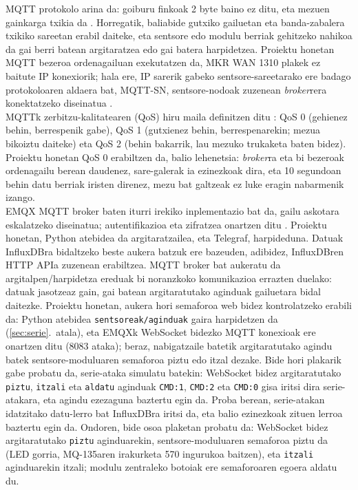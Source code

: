 \documentclass[10pt]{article}
\newcommand{\acpar}[1]{(\acs{#1})\acused{#1}}
\begin{document}
\ac{MQTT} protokolo arina da: goiburu finkoak 2 byte baino ez ditu, eta mezuen gainkarga txikia da \cite{mqtt5}. Horregatik, baliabide gutxiko gailuetan eta banda-zabalera txikiko sareetan erabil daiteke, eta sentsore edo modulu berriak gehitzeko nahikoa da gai berri batean argitaratzea edo gai batera harpidetzea. Proiektu honetan \ac{MQTT} bezeroa ordenagailuan exekutatzen da, MKR WAN 1310 plakek ez baitute \ac{IP} konexiorik; hala ere, \ac{IP} sarerik gabeko sentsore-sareetarako ere badago protokoloaren aldaera bat, MQTT-SN, sentsore-nodoak zuzenean \textit{broker}rera konektatzeko diseinatua \cite{hunkeler2008mqtt}.\\

\ac{MQTT}k zerbitzu-kalitatearen \acpar{QoS} hiru maila definitzen ditu \cite{mqtt5}: \acs{QoS} 0 (gehienez behin, berrespenik gabe), \acs{QoS} 1 (gutxienez behin, berrespenarekin; mezua bikoiztu daiteke) eta \acs{QoS} 2 (behin bakarrik, lau mezuko trukaketa baten bidez). Proiektu honetan \acs{QoS} 0 erabiltzen da, balio lehenetsia: \textit{broker}ra eta bi bezeroak ordenagailu berean daudenez, sare-galerak ia ezinezkoak dira, eta 10 segundoan behin datu berriak iristen direnez, mezu bat galtzeak ez luke eragin nabarmenik izango.\\

EMQX \ac{MQTT} broker baten iturri irekiko inplementazio bat da, gailu askotara eskalatzeko diseinatua; autentifikazioa eta zifratzea onartzen ditu \cite{bender2021open}. Proiektu honetan, Python atebidea da argitaratzailea, eta Telegraf, harpideduna. Datuak InfluxDBra bidaltzeko beste aukera batzuk ere bazeuden, adibidez, InfluxDBren \ac{HTTP} \ac{API}a zuzenean erabiltzea. \ac{MQTT} broker bat aukeratu da argitalpen/harpidetza ereduak bi noranzkoko komunikazioa errazten duelako: datuak jasotzeaz gain, gai batean argitaratutako aginduak gailuetara bidal daitezke. Proiektu honetan, aukera hori semaforoa web bidez kontrolatzeko erabili da: Python atebidea \texttt{sentsoreak/aginduak} gaira harpidetzen da (\ref{sec:serie}.~atala), eta EMQXk WebSocket bidezko \ac{MQTT} konexioak ere onartzen ditu (8083 ataka); beraz, nabigatzaile batetik argitaratutako agindu batek sentsore-moduluaren semaforoa piztu edo itzal dezake. Bide hori plakarik gabe probatu da, serie-ataka simulatu batekin: WebSocket bidez argitaratutako \texttt{piztu}, \texttt{itzali} eta \texttt{aldatu} aginduak \texttt{CMD:1}, \texttt{CMD:2} eta \texttt{CMD:0} gisa iritsi dira serie-atakara, eta agindu ezezaguna baztertu egin da. Proba berean, serie-atakan idatzitako datu-lerro bat InfluxDBra iritsi da, eta balio ezinezkoak zituen lerroa baztertu egin da. Ondoren, bide osoa plaketan probatu da: WebSocket bidez argitaratutako \texttt{piztu} aginduarekin, sentsore-moduluaren semaforoa piztu da (LED gorria, MQ-135aren irakurketa 570 ingurukoa baitzen), eta \texttt{itzali} aginduarekin itzali; modulu zentraleko botoiak ere semaforoaren egoera aldatu du.\\
\end{document}
